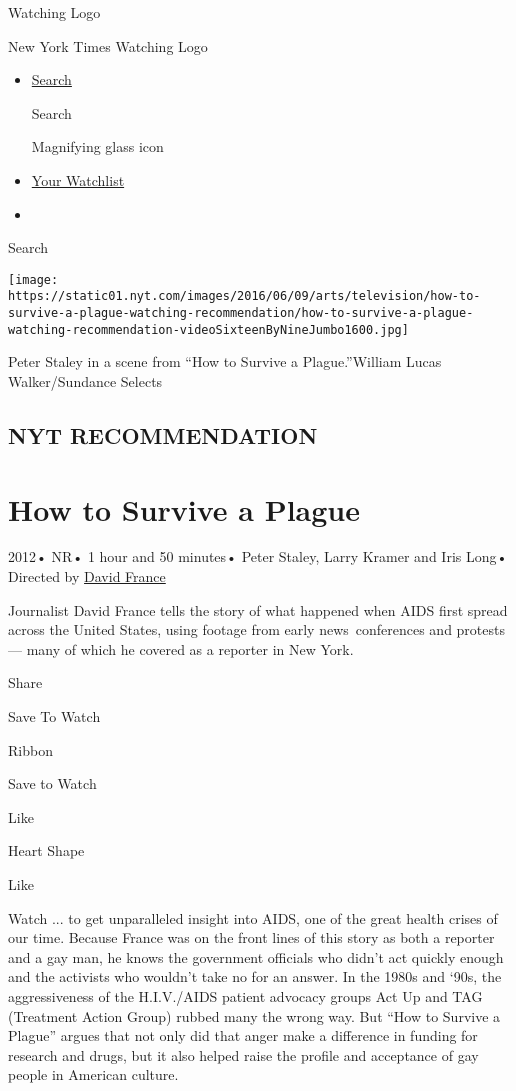 \href{/watching}{}

Watching Logo

New York Times Watching Logo

\begin{itemize}
\item
  \href{/watching/search}{Search}

  Search

  Magnifying glass icon
\item
  \href{/watching/watchlist}{Your Watchlist}
\item
\end{itemize}

Search

\texttt{[image: https://static01.nyt.com/images/2016/06/09/arts/television/how-to-survive-a-plague-watching-recommendation/how-to-survive-a-plague-watching-recommendation-videoSixteenByNineJumbo1600.jpg]}

Peter Staley in a scene from ``How to Survive a Plague.''William Lucas
Walker/Sundance Selects

\hypertarget{nyt-recommendation}{%
\subsection{NYT RECOMMENDATION}\label{nyt-recommendation}}

\hypertarget{how-to-survive-a-plague}{%
\section{How to Survive a Plague}\label{how-to-survive-a-plague}}

2012• NR• 1 hour and 50 minutes• Peter Staley, Larry Kramer and Iris
Long• Directed by
\href{/watching/search?q=David\%20France\&director=david-france}{David
France}

Journalist David France tells the story of what happened when AIDS first
spread across the United States, using footage from early
news~conferences and protests --- many of which he covered as a reporter
in New York.

Share

Save To Watch

Ribbon

Save to Watch

Like

Heart Shape

Like

Watch ... to get unparalleled insight into AIDS, one of the great health
crises of our time. Because France was on the front lines of this story
as both a reporter and a gay man, he knows the government officials who
didn't act quickly enough and the activists who wouldn't take no for an
answer. In the 1980s and `90s, the aggressiveness of the H.I.V./AIDS
patient advocacy groups Act Up and TAG (Treatment Action Group) rubbed
many the wrong way. But ``How to Survive a Plague'' argues that not only
did that anger make a difference in funding for research and drugs, but
it also helped raise the profile and acceptance of gay people in
American culture.


